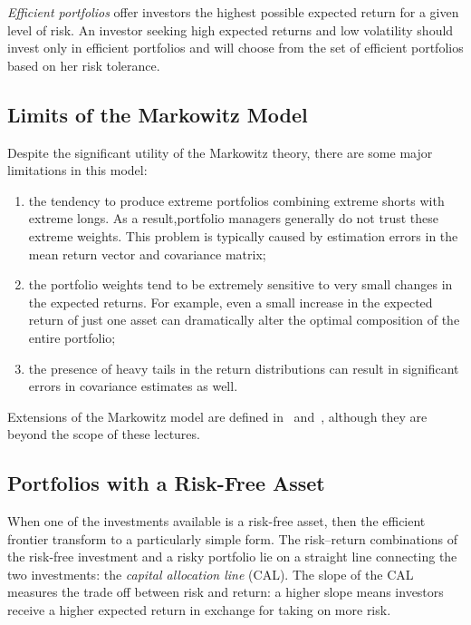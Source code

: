 \emph{Efficient portfolios} offer investors the highest possible expected return for a given level of risk. 
An investor seeking high expected returns and low volatility should invest only in efficient portfolios and will choose from the set of efficient portfolios based on her risk tolerance.
    
\subsection{Limits of the Markowitz Model}
\label{limits-of-the-markowitz-model}

Despite the significant utility of the Markowitz theory, there are some major limitations in this model:

\begin{enumerate}
\tightlist
\item the tendency to produce extreme portfolios combining extreme shorts with extreme longs. As a result,portfolio managers generally do not trust these extreme weights. This problem is typically caused by
estimation errors in the mean return vector and covariance matrix;
\item the portfolio weights tend to be extremely sensitive to very small changes in the expected returns. For example, even a small increase in the expected return of just one asset can dramatically alter the optimal composition of the entire portfolio;
\item the presence of heavy tails in the return distributions can result in significant errors in covariance estimates as well.
\end{enumerate}

Extensions of the Markowitz model are defined in~\cite{bib:post_modern_theory} and~\cite{bib:black_litterman}, although they are beyond the scope of these lectures. 
    
\subsection{Portfolios with a Risk-Free Asset}
\label{portfolios-with-a-risk-free-asset}

When one of the investments available is a risk-free asset, then the efficient frontier transform to a particularly simple form. The risk–return combinations of the risk-free investment and a risky portfolio lie on a straight line connecting the two investments: the \emph{capital allocation line} (CAL). The slope of the CAL measures the trade off between risk and return: a higher slope means investors receive a higher expected return in exchange for taking on more risk.


